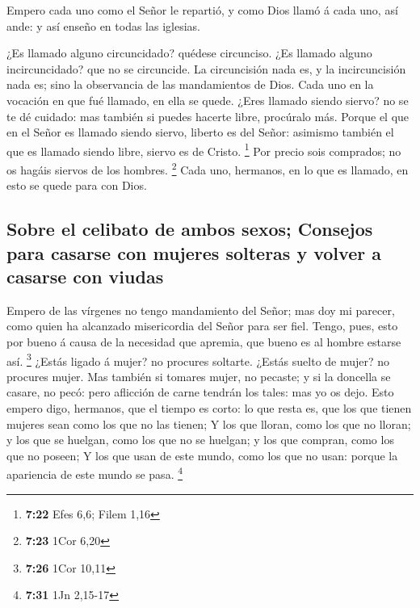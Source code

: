 Empero cada uno como el Señor le repartió, y como Dios
llamó á cada uno, así ande: y así enseño en todas las iglesias.

 ¿Es llamado alguno circuncidado? quédese circunciso. ¿Es
llamado alguno incircuncidado? que no se circuncide.  La
circuncisión nada es, y la incircuncisión nada es; sino la observancia
de las mandamientos de Dios.  Cada uno en la vocación en
que fué llamado, en ella se quede.  ¿Eres llamado siendo
siervo? no se te dé cuidado: mas también si puedes hacerte libre,
procúralo más.  Porque el que en el Señor es llamado
siendo siervo, liberto es del Señor: asimismo también el que es llamado
siendo libre, siervo es de Cristo. \footnote{\textbf{7:22} Efes 6,6;
  Filem 1,16}  Por precio sois comprados; no os hagáis
siervos de los hombres. \footnote{\textbf{7:23} 1Cor 6,20}
 Cada uno, hermanos, en lo que es llamado, en esto se
quede para con Dios.

\hypertarget{sobre-el-celibato-de-ambos-sexos-consejos-para-casarse-con-mujeres-solteras-y-volver-a-casarse-con-viudas}{%
\subsection{Sobre el celibato de ambos sexos; Consejos para casarse con
mujeres solteras y volver a casarse con
viudas}\label{sobre-el-celibato-de-ambos-sexos-consejos-para-casarse-con-mujeres-solteras-y-volver-a-casarse-con-viudas}}

 Empero de las vírgenes no tengo mandamiento del Señor;
mas doy mi parecer, como quien ha alcanzado misericordia del Señor para
ser fiel.  Tengo, pues, esto por bueno á causa de la
necesidad que apremia, que bueno es al hombre estarse así. \footnote{\textbf{7:26}
  1Cor 10,11}  ¿Estás ligado á mujer? no procures
soltarte. ¿Estás suelto de mujer? no procures mujer.  Mas
también si tomares mujer, no pecaste; y si la doncella se casare, no
pecó: pero aflicción de carne tendrán los tales: mas yo os dejo.
 Esto empero digo, hermanos, que el tiempo es corto: lo
que resta es, que los que tienen mujeres sean como los que no las
tienen;  Y los que lloran, como los que no lloran; y los
que se huelgan, como los que no se huelgan; y los que compran, como los
que no poseen;  Y los que usan de este mundo, como los
que no usan: porque la apariencia de este mundo se pasa. \footnote{\textbf{7:31}
  1Jn 2,15-17}

